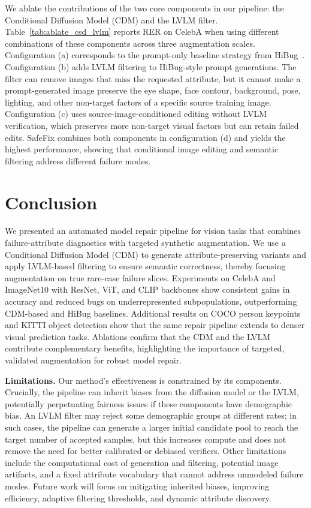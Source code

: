 \documentclass[10pt]{article} %
\newcommand{\model}{SafeFix\xspace}
\newcommand{\hibug}{HiBug\xspace}
\begin{document}
We ablate the contributions of the two core components in our pipeline: the Conditional Diffusion Model (CDM) and the LVLM filter. Table~\ref{tab:ablate_csd_lvlm} reports RER on CelebA when using different combinations of these components across three augmentation scales. Configuration (a) corresponds to the prompt-only baseline strategy from \hibug~\citep{chen2023hibug}. Configuration (b) adds LVLM filtering to HiBug-style prompt generations. The filter can remove images that miss the requested attribute, but it cannot make a prompt-generated image preserve the eye shape, face contour, background, pose, lighting, and other non-target factors of a specific source training image. Configuration (c) uses source-image-conditioned editing without LVLM verification, which preserves more non-target visual factors but can retain failed edits. \model{} combines both components in configuration (d) and yields the highest performance, showing that conditional image editing and semantic filtering address different failure modes.

\section{Conclusion}

We presented an automated model repair pipeline for vision tasks that combines failure‐attribute diagnostics with targeted synthetic augmentation. We use a Conditional Diffusion Model (CDM) to generate attribute-preserving variants and apply LVLM-based filtering to ensure semantic correctness, thereby focusing augmentation on true rare-case failure slices. Experiments on CelebA and ImageNet10 with ResNet, ViT, and CLIP backbones show consistent gains in accuracy and reduced bugs on underrepresented subpopulations, outperforming CDM-based and \hibug{} baselines. Additional results on COCO person keypoints and KITTI object detection show that the same repair pipeline extends to denser visual prediction tasks. Ablations confirm that the CDM and the LVLM contribute complementary benefits, highlighting the importance of targeted, validated augmentation for robust model repair.

\noindent\textbf{Limitations.}
Our method’s effectiveness is constrained by its components. Crucially, the pipeline can inherit biases from the diffusion model or the LVLM, potentially perpetuating fairness issues if these components have demographic bias. An LVLM filter may reject some demographic groups at different rates; in such cases, the pipeline can generate a larger initial candidate pool to reach the target number of accepted samples, but this increases compute and does not remove the need for better calibrated or debiased verifiers. Other limitations include the computational cost of generation and filtering, potential image artifacts, and a fixed attribute vocabulary that cannot address unmodeled failure modes. Future work will focus on mitigating inherited biases, improving efficiency, adaptive filtering thresholds, and dynamic attribute discovery.
\end{document}
